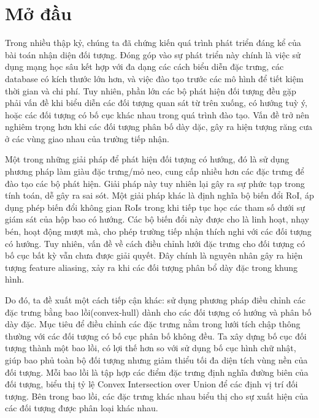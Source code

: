\documentclass[12pt,a4paper,openany,oneside]{report}
\begin{document}
 
\newpage
{} 
\pagestyle{fancy} 

\chapter*{Mở đầu}

Trong nhiều thập kỷ, chúng ta đã chứng kiến quá trình phát triển đáng kể của bài toán nhận diện đối tượng. Đóng góp vào sự phát triển này chính là việc sử dụng mạng học sâu kết hợp với đa dạng các cách biểu diễn đặc trưng, các database có kích thước lớn hơn, và việc đào tạo trước các mô hình để tiết kiệm thời gian và chi phí. Tuy nhiên, phần lớn các bộ phát hiện đối tượng đều gặp phải vấn đề khi biểu diễn các đối tượng quan sát từ trên xuống, có hướng tuỳ ý, hoặc các đối tượng có bố cục khác nhau trong quá trình đào tạo. Vấn đề trở nên nghiêm trọng hơn khi các đối tượng phân bố dày dặc, gây ra hiện tượng răng cưa ở các vùng giao nhau của trường tiếp nhận.


Một trong những giải pháp để phát hiện đối tượng có hướng, đó là sử dụng phương pháp làm giàu đặc trưng/mỏ neo, cung cấp nhiều hơn các đặc trưng để đào tạo các bộ phát hiện. Giải pháp này tuy nhiên lại gây ra sự phức tạp trong tính toán, dễ gây ra sai sót. Một giải pháp khác là định nghĩa bộ biến đổi RoI, áp dụng phép biến đổi không gian RoIs trong khi tiếp tục học các tham số dưới sự giám sát của hộp bao có hướng. Các bộ biến đổi này được cho là linh hoạt, nhạy bén, hoạt động mượt mà, cho phép trường tiếp nhận thích nghi với các đối tượng có hướng. Tuy nhiên, vấn đề về cách điều chỉnh lưới đặc trưng cho đối tượng có bố cục bất kỳ vẫn chưa được giải quyết. Đây chính là nguyên nhân gây ra hiện tượng feature aliasing, xảy ra khi các đối tượng phân bổ dày đặc trong khung hình.


Do đó, ta đề xuất một cách tiếp cận khác: sử dụng phương pháp điều chỉnh các đặc trưng bằng bao lồi(convex-hull) dành cho các đối tượng có hướng và phân bố dày đặc. Mục tiêu để điều chỉnh các đặc trưng nằm trong lưới tích chập thông thường với các đối tượng có bố cục phân bố không đều. Ta xây dựng bố cục đối tượng thành một bao lồi, có lợi thế hơn so với sử dụng bố cục hình chữ nhật, giúp bao phủ toàn bộ đối tượng nhưng giảm thiểu tối đa diện tích vùng nền của đối tượng. Mỗi bao lồi là tập hợp các điểm đặc trưng định nghĩa đường biên của đối tượng, biểu thị tỷ lệ Convex Intersection over Union để các định vị trí đối tượng. Bên trong bao lồi, các đặc trưng khác nhau biểu thị cho sự xuất hiện của các đối tượng được phân loại khác nhau.
\end{document}

